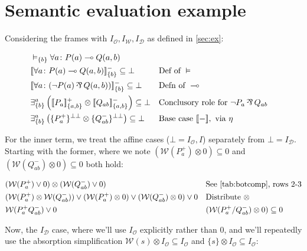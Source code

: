 \documentclass{article}
\theoremstyle{definition}
\DeclareMathOperator{\parr}{\rotatebox[origin=c]{180}{\&}}
\newcommand{\cD}{\mathcal{D}}
\newcommand{\cO}{\mathcal{O}}
\newcommand{\cW}{\mathcal{W}}
\newcommand{\bbrack}[1]{[\![ #1 ]\!]}
\begin{document}
    \section{Semantic evaluation example}
    \label{sec:semeval}

    Considering the frames with $I_\cO,I_\cW,I_\cD $ as defined in \cref{sec:ex}:
    
    \begin{align*}
        &\vDash_{\{b\}} \forall a\colon P(a)\multimap Q(a,b) \\ 
        & \bbrack{\forall a\colon P(a)\multimap Q(a,b)}^-_{\{b\}} \subseteq \bot && \text{Def of }\vDash \\ 
        & \bbrack{\forall a\colon (\neg P(a)\parr Q(a,b))}^-_{\{b\}} \subseteq \bot && \text{Defn of }\multimap\\
        &\exists_{\{b\}}^a\left( \bbrack{P_a}^+_{\{a,b\}}\otimes \bbrack{Q_{ab}}^-_{\{a,b\}} \right) \subseteq \bot && \text{Conclusory role for }\neg P_a \parr Q_{ab}\\
        &\exists_{\{b\}}^a\left(\{P^+_a\}^{\bot\bot}\otimes \{Q^-_{ab}\}^{\bot\bot}\right) \subseteq \bot   && \text{Base case }\bbrack{-}, \text{ via } \eta\\
\end{align*}

For the inner term, we treat the affine cases ($\bot=I_\cO,I$) separately from $\bot=I_\cD $. Starting with the former, where we note $(\cW(P^+_a )\otimes 0)\subseteq 0$ and $(\cW(Q^-_{ab})\otimes 0)\subseteq 0$ both hold:

\begin{align*}
        &(\cW(P^+_a)\vee 0)\otimes (\cW(Q^-_{ab})\vee 0)   && \text{See \cref{tab:botcomp}, rows 2-3}\\
        &(\cW(P^+_a)\otimes \cW(Q^-_{ab}))\vee (\cW(P^+_a)\otimes 0)\vee (\cW(Q^-_{ab})\otimes 0) \vee  0  && \text{Distribute }\otimes\\
        &\cW(P^+_aQ^-_{ab})  \vee  0&& (\cW(P^+_a / Q^-_{ab})\otimes 0)\subseteq 0\\
\end{align*}

Now, the $I_\cD $ case, where we'll use $I_\cO$ explicitly rather than $0$, and we'll repeatedly use the absorption simplification $\cW(s)\otimes I_\cO \subseteq I_\cO$ and $\{s\}\otimes I_\cO\subseteq I_\cO$:
\end{document}
